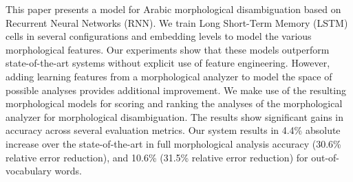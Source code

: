 This paper presents a model for Arabic morphological disambiguation based on Recurrent Neural Networks (RNN). We train Long Short-Term Memory (LSTM) cells in several configurations and embedding levels to model the various morphological features. Our experiments show that these models outperform state-of-the-art systems without explicit use of feature engineering. However, adding learning features from a morphological analyzer to model the space of possible analyses provides additional improvement. We make use of the resulting morphological models for scoring and ranking the analyses of the morphological analyzer for morphological disambiguation. The results show significant gains in accuracy across several evaluation metrics. Our system results in 4.4\% absolute increase over the state-of-the-art in full morphological analysis accuracy (30.6\% relative error reduction), and 10.6\% (31.5\% relative error reduction) for out-of-vocabulary words.
